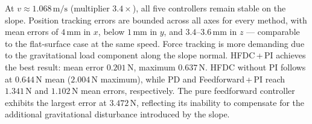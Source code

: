 \documentclass[
	german,%
	accentcolor=9c,%
	ruledheaders=section,%
	class=report,%
	thesis={type=bachelor},%
	fontsize=11pt,%
	parskip=half-,%
	custommargins=true,%
	marginpar=false,%
]{tudapub}
\begin{document}
At $v \approx 1.068\,\mathrm{m/s}$ (multiplier $3.4\times$), all five
controllers remain stable on the slope.
Position tracking errors are bounded across all axes for every method,
with mean errors of $4\,\mathrm{mm}$ in $x$, below $1\,\mathrm{mm}$ in $y$,
and $3.4$--$3.6\,\mathrm{mm}$ in $z$ — comparable to the flat-surface case at
the same speed.
Force tracking is more demanding due to the gravitational load component along
the slope normal.
HFDC\,+\,PI achieves the best result: mean error $0.201\,\mathrm{N}$,
maximum $0.637\,\mathrm{N}$.
HFDC without PI follows at $0.644\,\mathrm{N}$ mean ($2.004\,\mathrm{N}$
maximum), while PD and Feedforward\,+\,PI reach $1.341\,\mathrm{N}$ and
$1.102\,\mathrm{N}$ mean errors, respectively.
The pure feedforward controller exhibits the largest error at
$3.472\,\mathrm{N}$, reflecting its inability to compensate for the additional
gravitational disturbance introduced by the slope.
\end{document}
